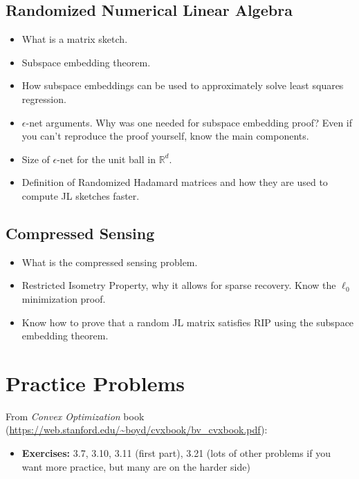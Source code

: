 \documentclass[10pt]{article}
\newcommand{\R}{\mathbb{R}}
\begin{document}
\subsection{Randomized Numerical Linear Algebra}
\begin{itemize}
	\item What is a matrix sketch.
	\item Subspace embedding theorem.
	\item How subspace embeddings can be used to approximately solve least squares regression.
	\item $\epsilon$-net arguments. Why was one needed for subspace embedding proof? Even if you can't reproduce the proof yourself, know the main components.
	\item Size of $\epsilon$-net for the unit ball in $\R^d$. 
	\item Definition of Randomized Hadamard matrices and how they are used to compute JL sketches faster.
\end{itemize}

\subsection{Compressed Sensing}
\begin{itemize}
	\item What is the compressed sensing problem.
	\item Restricted Isometry Property, why it allows for sparse recovery. Know the $\ell_0$ minimization proof.
	\item Know how to prove that a random JL matrix satisfies RIP using the subspace embedding theorem.
\end{itemize}


\section{Practice Problems}

From \emph{Convex Optimization} book (\url{https://web.stanford.edu/\~boyd/cvxbook/bv_cvxbook.pdf}):
\begin{itemize}
	\item \textbf{Exercises:} 3.7, 3.10, 3.11 (first part), 3.21 (lots of other problems if you want more practice, but many are on the harder side)
\end{itemize}
\end{document}
